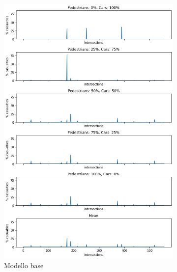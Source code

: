 \newpage

\begin{figure}[p]
    \centering
    \begin{subfigure}{0.45\textwidth}
        \centering
        \includegraphics[width=\textwidth]{images/analisi/comparison-critical-ints-base.png}
        \caption{Modello base}
        \label{fig:base-ints-casualties}
    \end{subfigure}
    \hfill
    \begin{subfigure}{0.45\textwidth}
        \centering

\end{subfigure}
\end{figure}
